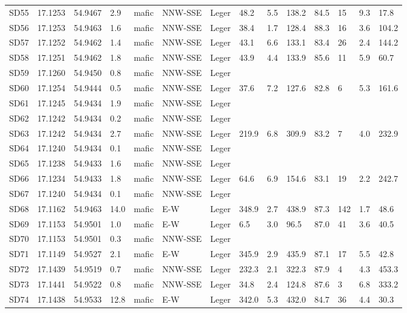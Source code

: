 \begin{tabular}{llllllllllllll}
SD55 & 17.1253 & 54.9467 & 2.9 & mafic & NNW-SSE & Leger & 48.2 & 5.5 & 138.2 & 84.5 & 15 & 9.3 & 17.8 \\
SD56 & 17.1253 & 54.9463 & 1.6 & mafic & NNW-SSE & Leger & 38.4 & 1.7 & 128.4 & 88.3 & 16 & 3.6 & 104.2 \\
SD57 & 17.1252 & 54.9462 & 1.4 & mafic & NNW-SSE & Leger & 43.1 & 6.6 & 133.1 & 83.4 & 26 & 2.4 & 144.2 \\
SD58 & 17.1251 & 54.9462 & 1.8 & mafic & NNW-SSE & Leger & 43.9 & 4.4 & 133.9 & 85.6 & 11 & 5.9 & 60.7 \\
SD59 & 17.1260 & 54.9450 & 0.8 & mafic & NNW-SSE & Leger &  &  &  &  &  &  &  \\
SD60 & 17.1254 & 54.9444 & 0.5 & mafic & NNW-SSE & Leger & 37.6 & 7.2 & 127.6 & 82.8 & 6 & 5.3 & 161.6 \\
SD61 & 17.1245 & 54.9434 & 1.9 & mafic & NNW-SSE & Leger &  &  &  &  &  &  &  \\
SD62 & 17.1242 & 54.9434 & 0.2 & mafic & NNW-SSE & Leger &  &  &  &  &  &  &  \\
SD63 & 17.1242 & 54.9434 & 2.7 & mafic & NNW-SSE & Leger & 219.9 & 6.8 & 309.9 & 83.2 & 7 & 4.0 & 232.9 \\
SD64 & 17.1240 & 54.9434 & 0.1 & mafic & NNW-SSE & Leger &  &  &  &  &  &  &  \\
SD65 & 17.1238 & 54.9433 & 1.6 & mafic & NNW-SSE & Leger &  &  &  &  &  &  &  \\
SD66 & 17.1234 & 54.9433 & 1.8 & mafic & NNW-SSE & Leger & 64.6 & 6.9 & 154.6 & 83.1 & 19 & 2.2 & 242.7 \\
SD67 & 17.1240 & 54.9434 & 0.1 & mafic & NNW-SSE & Leger &  &  &  &  &  &  &  \\
SD68 & 17.1162 & 54.9463 & 14.0 & mafic & E-W & Leger & 348.9 & 2.7 & 438.9 & 87.3 & 142 & 1.7 & 48.6 \\
SD69 & 17.1153 & 54.9501 & 1.0 & mafic & E-W & Leger & 6.5 & 3.0 & 96.5 & 87.0 & 41 & 3.6 & 40.5 \\
SD70 & 17.1153 & 54.9501 & 0.3 & mafic & NNW-SSE & Leger &  &  &  &  &  &  &  \\
SD71 & 17.1149 & 54.9527 & 2.1 & mafic & E-W & Leger & 345.9 & 2.9 & 435.9 & 87.1 & 17 & 5.5 & 42.8 \\
SD72 & 17.1439 & 54.9519 & 0.7 & mafic & NNW-SSE & Leger & 232.3 & 2.1 & 322.3 & 87.9 & 4 & 4.3 & 453.3 \\
SD73 & 17.1441 & 54.9522 & 0.8 & mafic & NNW-SSE & Leger & 34.8 & 2.4 & 124.8 & 87.6 & 3 & 6.8 & 333.2 \\
SD74 & 17.1438 & 54.9533 & 12.8 & mafic & E-W & Leger & 342.0 & 5.3 & 432.0 & 84.7 & 36 & 4.4 & 30.3 \\

\end{tabular}
